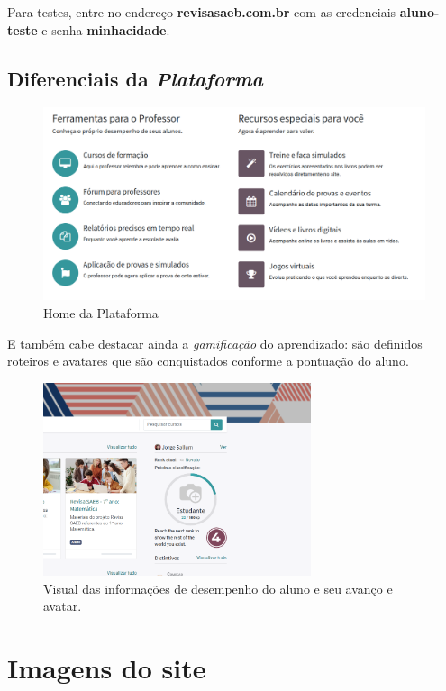 Para testes, entre no endereço \textbf{revisasaeb.com.br} com 
as credenciais \textbf{aluno-teste} e senha \textbf{minhacidade}. 

\section{Diferenciais da \textit{Plataforma}}

\begin{figure}[h]
\includegraphics[width=\textwidth]{imgs/spec}
\caption{Home da Plataforma}
\end{figure}

E também cabe destacar ainda a \textit{gamificação} do aprendizado:
são definidos roteiros e avatares que são conquistados conforme a 
pontuação do  aluno. 

\begin{figure}[b]
\centering \includegraphics[width=0.7\textwidth]{imgs/gamification}
\caption{Visual das informações de desempenho do aluno e seu avanço e avatar.}
\end{figure}




\chapter{Imagens do site}

